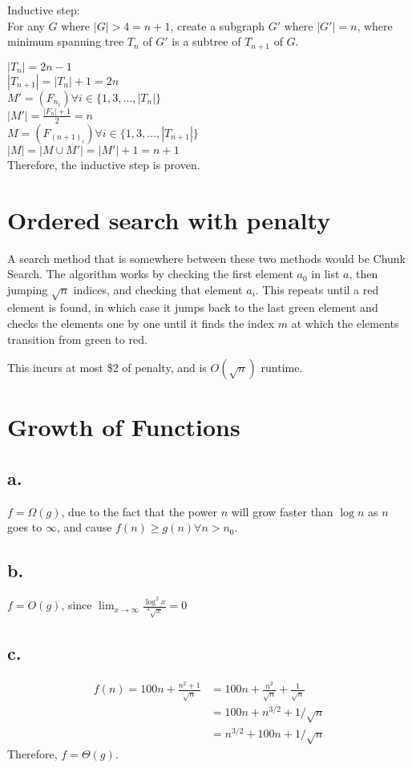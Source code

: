 \documentclass[14pt, letterpaper]{article}
\begin{document}
Inductive step: \\
For any $G$ where $|G| > 4 = n + 1$, create a subgraph $G'$ where $|G'| = n$,
where minimum spanning tree $T_n$ of $G'$ is a subtree of $T_{n+1}$ of $G$.

$|T_{n}| = 2n - 1$ \\
$|T_{n+1}| = |T_n| + 1 = 2n$ \\
$M' = (F_{n_i}) \forall i \in \{1, 3, \ldots, |T_{n}|\}$ \\
$|M'| = \frac{|F_{n}| + 1}{2} = n$ \\
$M = (F_{(n+1)_i}) \forall i \in \{1, 3, \ldots, |T_{n+1}|\}$ \\
$|M| = |M \cup M'| = |M'| + 1 = n + 1$ \\

Therefore, the inductive step is proven.


\section{Ordered search with penalty}
A search method that is somewhere between these two methods would be Chunk
Search. The algorithm works by checking the first element $a_0$ in list $a$,
then jumping $\sqrt n$ indices, and checking that element $a_i$. This
repeats until a red element is found, in which case it jumps back to the last
green element and checks the elements one by one until it finds the index $m$
at which the elements transition from green to red.

This incurs at most \$2 of penalty, and is $O(\sqrt n)$ runtime.

\section{Growth of Functions}
\subsection{a.}
$f = \Omega(g)$, due to the fact that the power $n$ will grow faster than
$\log n$ as $n$ goes to $\infty$, and cause $f(n) \geq g(n) \forall n > n_0$.

\subsection{b.}
$f = O(g)$, since $\displaystyle \lim_{x \to \infty} \frac{\log^2 x}{^3\sqrt x} = 0$

\subsection{c.}
\begin{equation}
	\begin{split}
		f(n) = 100n + \frac{n^2 + 1}{\sqrt n} & = 100n + \frac{n^2}{\sqrt n} + \frac{1}{\sqrt n} \\
		& = 100n + n^{3/2} + 1/{\sqrt n} \\
		& = n^{3/2} + 100n + 1/{\sqrt n}
	\end{split}
\end{equation}
Therefore, $f = \Theta(g)$.
\end{document}
